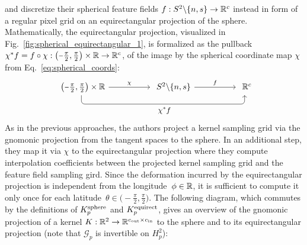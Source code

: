 \citet{zhao2018distortion} and \citet{tateno2018distortion} discretize their spherical feature fields $f: S^2 \backslash \{n,s\} \to \mathbb{R}^c$ instead in form of a regular pixel grid on an equirectangular projection of the sphere.
Mathematically, the equirectangular projection, visualized in Fig.~\ref{fig:spherical_equirectangular_1}, is formalized as the pullback
$\chi^*f = f \circ \chi: \big(\minus\frac{\pi}{2}, \frac{\pi}{2}\big) \times \R \to \R^c$,
of the image by the spherical coordinate map $\chi$ from Eq.~\eqref{eq:spherical_coords}:
\begin{equation}\label{cd:equirectangular_proj}
\begin{tikzcd}[column sep=50pt, row sep=25pt, font=\normalsize]
    {\big(\minus\frac{\pi}{2}, \frac{\pi}{2}\big)} \times \R
        \arrow[r, "\chi"]
        \arrow[rr, pos=.5, rounded corners, to path={ 
                -- ([yshift=-2.5ex]\tikztostart.south) 
                --node[below]{\small$
                    \chi^*f
                    $} ([yshift=-2.5ex]\tikztotarget.south) 
                -- (\tikztotarget.south)
                }]
    & S^2 \backslash \{n,s\}
        \arrow[r, "f"]
    & \R^c \mkern-12mu\phantom{\big)}
\end{tikzcd}
\end{equation}
As in the previous approaches, the authors project a kernel sampling grid via the gnomonic projection from the tangent spaces to the sphere.
In an additional step, they map it via $\chi$ to the equirectangular projection where they compute interpolation coefficients between the projected kernel sampling grid and the feature field sampling gird.
Since the deformation incurred by the equirectangular projection is independent from the longitude~$\phi \in \mathbb{R}$, it is sufficient to compute it only once for each latitude~$\theta \in {\textstyle \big(\minus\frac{\pi}{2}, \frac{\pi}{2}\big)}$.
The following diagram, which commutes by the definitions of $K^{\textup{sphere}}_p$ and $K^{\textup{equirect}}_p$, gives an overview of the gnomonic projection of a kernel $K: \mathbb{R}^2 \to \mathbb{R}^{{c_\textup{out}}\times{c_\textup{in}}}$ to the sphere \cite{coors2018spherenet,eder2019convolutions,martin2020panoramic} and to its equirectangular projection \cite{zhao2018distortion,tateno2018distortion} (note that $\mathscr{G}_p$ is invertible on $H_p^2$):
